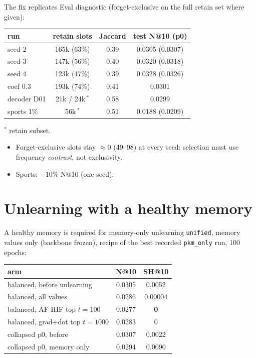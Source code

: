 \documentclass{beamer}
\begin{document}
\begin{frame}{The fix replicates}
Eval diagnostic (forget-exclusive on the full retain set where given):
\begin{center}
\small
\begin{tabular}{|l|c|c|c|}
\hline
run & retain slots & Jaccard & test N@10 (p0) \\
\hline
seed 2              & 165k (63\%) & 0.39 & 0.0305 (0.0307) \\
seed 3              & 147k (56\%) & 0.40 & 0.0320 (0.0318) \\
seed 4              & 123k (47\%) & 0.39 & 0.0328 (0.0326) \\
coef 0.3            & 193k (74\%) & 0.41 & 0.0301 \\
decoder D01         & 21k / 24k\,$^*$ & 0.58 & 0.0299 \\
sports 1\%          & 56k\,$^*$   & 0.51 & 0.0188 (0.0209) \\
\hline
\end{tabular}
\end{center}
{\footnotesize $^*$ retain subset.}

\begin{itemize}
  \item Forget-exclusive slots stay $\approx$0 (49--98) at every seed:
        selection must use frequency \emph{contrast}, not exclusivity.
  \item \alert{Sports}: $-10\%$ N@10 (one seed).
\end{itemize}
\end{frame}

\section{Unlearning with a healthy memory}

\begin{frame}{A healthy memory is required for memory-only unlearning}
\texttt{unified}, memory values only (backbone frozen), recipe of the best
recorded \texttt{pkm\_only} run, 100 epochs:
\begin{center}
\small
\begin{tabular}{|l|c|c|}
\hline
arm & N@10 & SH@10 \\
\hline
balanced, before unlearning        & 0.0305 & 0.0052 \\
balanced, all values               & 0.0286 & 0.00004 \\
balanced, AF-IHF top $t{=}100$     & 0.0277 & \textbf{0} \\
balanced, grad+dot top $t{=}1000$  & 0.0283 & 0 \\
\hline
collapsed p0, before               & 0.0307 & 0.0022 \\
collapsed p0, memory only          & 0.0294 & \alert{0.0090} \\
\hline
\end{tabular}
\end{center}
\end{frame}
\end{document}
